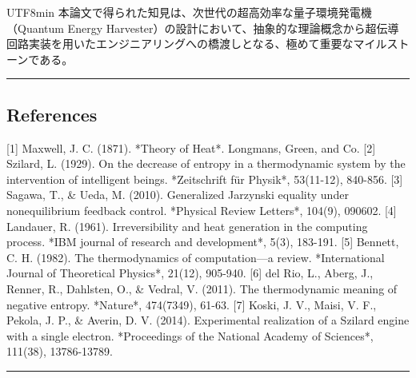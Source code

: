 \documentclass[a4paper,11pt,twocolumn]{article}
\begin{document}
\begin{CJK*}{UTF8}{min}
本論文で得られた知見は、次世代の超高効率な量子環境発電機（Quantum Energy Harvester）の設計において、抽象的な理論概念から超伝導回路実装を用いたエンジニアリングへの橋渡しとなる、極めて重要なマイルストーンである。

\vspace{1em}\hrule\vspace{1em}

\onecolumn
\subsection{References}
[1] Maxwell, J. C. (1871). *Theory of Heat*. Longmans, Green, and Co.
[2] Szilard, L. (1929). On the decrease of entropy in a thermodynamic system by the intervention of intelligent beings. *Zeitschrift für Physik*, 53(11-12), 840-856.
[3] Sagawa, T., \& Ueda, M. (2010). Generalized Jarzynski equality under nonequilibrium feedback control. *Physical Review Letters*, 104(9), 090602.
[4] Landauer, R. (1961). Irreversibility and heat generation in the computing process. *IBM journal of research and development*, 5(3), 183-191.
[5] Bennett, C. H. (1982). The thermodynamics of computation—a review. *International Journal of Theoretical Physics*, 21(12), 905-940.
[6] del Rio, L., Aberg, J., Renner, R., Dahlsten, O., \& Vedral, V. (2011). The thermodynamic meaning of negative entropy. *Nature*, 474(7349), 61-63.
[7] Koski, J. V., Maisi, V. F., Pekola, J. P., \& Averin, D. V. (2014). Experimental realization of a Szilard engine with a single electron. *Proceedings of the National Academy of Sciences*, 111(38), 13786-13789.


\vspace{1em}\hrule\vspace{1em}

\end{CJK*}
\end{document}
